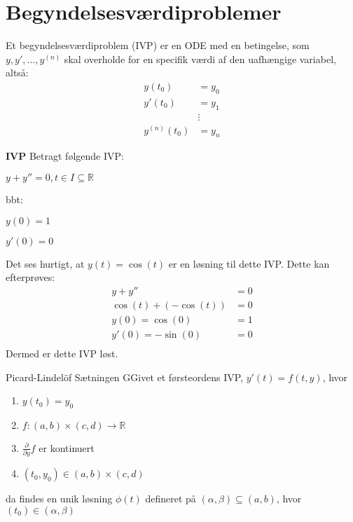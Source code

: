 \section{Begyndelsesværdiproblemer}

\begin{definition}
Et begyndelsesværdiproblem (IVP) er en ODE med en betingelse, som $y, y',\hdots, y^{(n)}$ skal overholde for en specifik værdi af den uafhængige variabel, altså:
\begin{align*}
    y(t_0) &= y_0 \\
    y'(t_0) &= y_1 \\
    &\vdots \\
    y^{(n)}(t_0) &= y_n
\end{align*}
\end{definition}

\begin{Example}\textbf{IVP}\hfill \break
\textnormal{Betragt følgende IVP:}\hfill \break
\centerline{$y+y''=0, t \in I \subseteq \mathbb{R}$}
\centerline{bbt:}
\centerline{$y(0)=1$}
\centerline{$y'(0)=0$} \hfill \break
\textnormal{Det ses hurtigt, at $y(t)=\cos(t)$ er en løsning til dette IVP. Dette kan efterprøves:}
\begin{align*}
    y+y''&=0 \\
    \cos(t)+(-\cos(t))&=0 \\
    y(0)=\cos(0)&=1\\
    y'(0)=-\sin(0)&=0\\ 
\end{align*}
\textnormal{Dermed er dette IVP løst.}
\end{Example}

\begin{mytheo}{Picard-Lindelöf Sætningen}
GGivet et førsteordens IVP, $y'(t)=f(t,y)$, hvor 

\begin{enumerate}
    \item $y(t_0)=y_0$
    \item $f:(a,b) \times (c,d) \rightarrow \mathbb{R}$
    \item $\frac{\partial}{\partial y}f$ er kontinuert
    \item $(t_0,y_0) \in (a,b) \times (c,d)$
\end{enumerate}

da findes en unik løsning $\phi(t)$ defineret på $(\alpha,\beta)\subseteq (a,b)$, hvor $(t_0) \in (\alpha, \beta)$ 
\end{mytheo}

